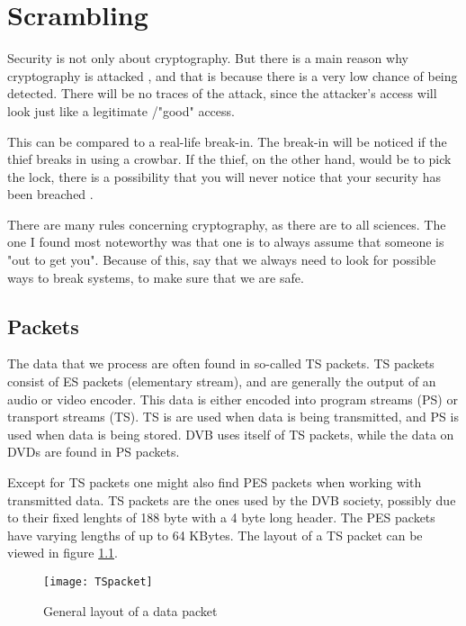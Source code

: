 \chapter{Scrambling}\label{ch:Scrambling}
Security is not only about cryptography. But there is a main reason why 
cryptography is attacked , and that is because there is a very low chance 
of being detected. There will be no traces of the attack, since the attacker’s 
access will look just like a legitimate /"good" access. 

This can be compared to a real-life break-in. The break-in will be noticed if 
the thief breaks in using a crowbar. If the thief, on the other hand, would be 
to pick the lock, there is a possibility that you will never notice that your 
security has been breached \citep{Schneier:2003}.

There are many rules concerning cryptography, as there are to all sciences. 
The one I found most noteworthy was that one is to always assume that someone 
is "out to get you". Because of this, \citet[pp. 12--14]{Schneier:2003} say that 
we always need  to look for possible ways to break systems, to make sure that
we are safe.


\section{Packets}\label{sec:Data}
The data that we process are often found in so-called TS packets. TS packets 
consist of ES packets (elementary stream), and are generally the output of an 
audio or video encoder. This data is either encoded into program streams (PS) or 
transport streams (TS). TS is are used when data is being transmitted, and PS is 
used when data is being stored. DVB uses itself of TS packets, while the data on 
DVDs are found in PS packets.

Except for TS packets one might also find PES packets when working with 
transmitted data. 
TS packets are the ones used by the DVB society, possibly due to their fixed 
lenghts of 188 byte with a 4 byte long header. The PES packets have varying 
lengths of up to 64 KBytes. The layout of a TS packet can be viewed in figure 
\ref{img:Package}.

\begin{figure}
\texttt{[image: TSpacket]}
\caption{General layout of a data packet \citep{DVB:2013}}
\label{img:Package}
\end{figure}

